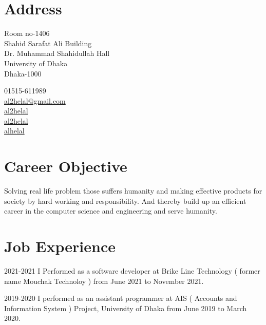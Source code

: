 \documentclass[a4paper,12pt]{article}
\begin{document}
\section{Address}
\noindent
\begin{minipage}{.7\textwidth}
  Room no-1406\\
  Shahid Sarafat Ali Building\\
  Dr. Muhammad Shahidullah Hall\\
  University of Dhaka\\
  Dhaka-1000\\
\end{minipage}
\begin{minipage}{.7\textwidth}
  \faPhone{} 01515-611989\\
  \faEnvelopeO{}  \href{mailto:al2helal@gmail.com}{al2helal@gmail.com}\\
  \faGithub{}  \href{https://github.com/al2helal}{al2helal}\\
  \faLinkedin{}  \href{https://www.linkedin.com/in/mdalhelal/}{al2helal}\\
  \faStackOverflow{}  \href{https://stackoverflow.com/users/5697418/alhelal}{alhelal}
\end{minipage}

\section{Career Objective}
\begin{CV}
\item Solving real life problem those suffers humanity and making effective products for society by hard working and responsibility. And thereby build up an efficient career in the computer science and engineering and serve humanity.
  \end{CV}

\section{Job Experience}

\begin{CV}
\item[2021-2021] I Performed as a software developer at Brike Line Technology ( former name Mouchak Technoloy ) from June 2021 to November 2021.
\item[2019-2020] I performed as an assistant programmer at AIS ( Accounts and Information System ) Project, University of Dhaka from June 2019 to March 2020.
\end{CV}
\end{document}
